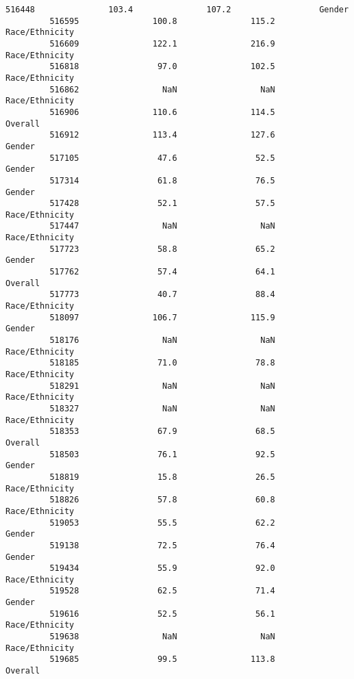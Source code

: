 \documentclass[11pt]{article}
\begin{document}
\begin{Verbatim}[commandchars=\\\{\}]
         516448               103.4               107.2                  Gender   
         516595               100.8               115.2          Race/Ethnicity   
         516609               122.1               216.9          Race/Ethnicity   
         516818                97.0               102.5          Race/Ethnicity   
         516862                 NaN                 NaN          Race/Ethnicity   
         516906               110.6               114.5                 Overall   
         516912               113.4               127.6                  Gender   
         517105                47.6                52.5                  Gender   
         517314                61.8                76.5                  Gender   
         517428                52.1                57.5          Race/Ethnicity   
         517447                 NaN                 NaN          Race/Ethnicity   
         517723                58.8                65.2                  Gender   
         517762                57.4                64.1                 Overall   
         517773                40.7                88.4          Race/Ethnicity   
         518097               106.7               115.9                  Gender   
         518176                 NaN                 NaN          Race/Ethnicity   
         518185                71.0                78.8          Race/Ethnicity   
         518291                 NaN                 NaN          Race/Ethnicity   
         518327                 NaN                 NaN          Race/Ethnicity   
         518353                67.9                68.5                 Overall   
         518503                76.1                92.5                  Gender   
         518819                15.8                26.5          Race/Ethnicity   
         518826                57.8                60.8          Race/Ethnicity   
         519053                55.5                62.2                  Gender   
         519138                72.5                76.4                  Gender   
         519434                55.9                92.0          Race/Ethnicity   
         519528                62.5                71.4                  Gender   
         519616                52.5                56.1          Race/Ethnicity   
         519638                 NaN                 NaN          Race/Ethnicity   
         519685                99.5               113.8                 Overall   
         

\end{Verbatim}
\end{document}
